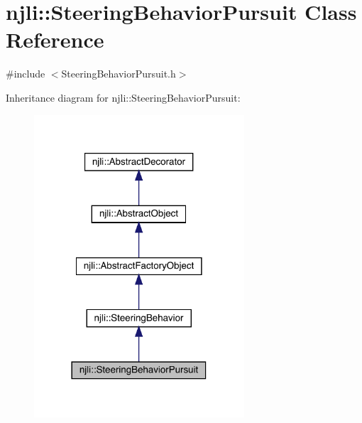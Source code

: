 \hypertarget{classnjli_1_1_steering_behavior_pursuit}{}\section{njli\+:\+:Steering\+Behavior\+Pursuit Class Reference}
\label{classnjli_1_1_steering_behavior_pursuit}


{\ttfamily \#include $<$Steering\+Behavior\+Pursuit.\+h$>$}



Inheritance diagram for njli\+:\+:Steering\+Behavior\+Pursuit\+:\nopagebreak
\begin{figure}[H]
\begin{center}
\leavevmode
\includegraphics[width=222pt]{classnjli_1_1_steering_behavior_pursuit__inherit__graph}
\end{center}
\end{figure}


